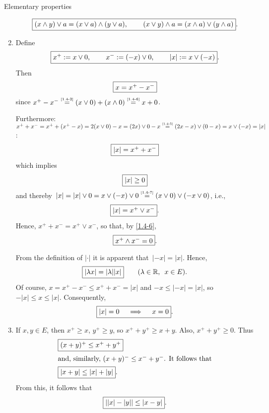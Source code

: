 \documentclass[main.tex]{subfiles}
\begin{document}
\begin{psec}{Elementary properties}
\begin{enumerate}
\begin{equation*}
\fbox{$ (x\wedge y)\vee a = (x\vee a)\wedge(y\vee a)
\textnormal{, }\qquad
(x\vee y)\wedge a = (x\wedge a)\vee (y\wedge a) $}
\textnormal{.}
\end{equation*}
\item %
\label{1.4-9}
Define
\begin{equation*}
\frmd{%
x^+ := x\vee 0\htam{, }\qquad
x^- := (-x)\vee 0\htam{, }\qquad
|x| := x\vee(-x)}
\htam{.}
\end{equation*}
Then 
\begin{equation*}
\fbox{$  x = x^+ - x^-  $}
\end{equation*}
since $x^+ - x^-
\isref{1.4-2}(x\vee 0)+(x\wedge 0) 
\isref{1.4-6}x+0$.

Furthermore:
$x^+ + x^- 
= x^+ + (x^+ - x) 
= 2(x\vee 0) -x
= (2x)\vee 0 -x
\isref{1.4-5} (2x-x)\vee(0-x) = x\vee(-x) = |x|$:
\begin{equation*}
\fbox{$ |x| = x^+ + x^- $}
\end{equation*}
which implies
\begin{equation*}
\fbox{$ |x|\ge 0 $}
\end{equation*}
and 
thereby~$|x|=|x|\vee 0
= x\vee(-x)\vee 0 \isref{1.4-7} (x\vee 0) \vee (-x\vee 0)$,
i.e., 
\begin{equation*}
\fbox{$ |x| = x^+ \vee x^- $}
\textnormal{.}
\end{equation*}
Hence, $x^+ + x^- = x^+ \vee x^-$,
so that, 
by \ref{1.4-6},
\begin{equation*}
\fbox{$ x^+ \wedge x^- = 0 $} 
\textnormal{.}
\end{equation*}

From the definition of $|\cdot|$
it is apparent that~$|-x|=|x|$.
Hence, 
\begin{equation*}
\fbox{$ |\lambda x|=|\lambda| |x| $} 
  \qquad (\lambda\in\mathbb{R}\textnormal{, }\ x\in E)\textnormal{.}
\end{equation*}
Of course,
$x=x^+ - x^-\leq x^+ + x^- = |x|$
and $-x\leq|-x|=|x|$,
so $-|x|\leq x \leq |x|$.
Consequently,
\begin{equation*}
\fbox{$ |x|=0 \quad \implies \quad x=0 $}
\textnormal{.}
\end{equation*}
%
\item%
\label{1.4-10}
If $x,y\in E$,
then $x^+\geq x$, 
$y^+\geq y$,
so $x^+ + y^+ \geq x+y$.
Also,
$x^+ + y^+\geq 0$.
Thus
\begin{align*}
&\fbox{$ (x+y)^+ \leq x^+ + y^+ $}\\
\intertext{and, 
similarly, 
$(x+y)^- \leq x^- + y^-$.
It follows that}
&\fbox{$ |x+y|\leq|x|+|y| $}
\textnormal{.}
\end{align*}
From this,
it follows that
\begin{equation*}
\fbox{$ ||x|-|y|| \leq |x-y| $}
\textnormal{.}
\end{equation*}


\end{enumerate}
\end{psec}
\end{document}
